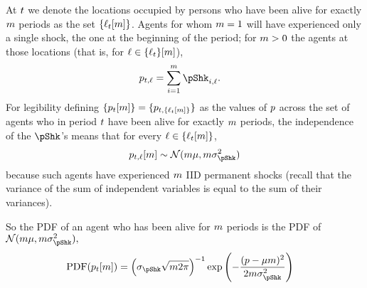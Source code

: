 \documentclass[../BufferStockTheory.tex]{subfiles}\usepackage{ApndxSteadyState}
\begin{document}
  At ${}t$ we denote the locations occupied by persons who have been alive for exactly $m$ periods as the set $\{\ell_{{}t}[m]\}$. Agents for whom $m=1$ will have experienced only a single shock, the one at the beginning of the period; for $m>0$ the agents at those locations (that is, for $\ell \in \{\ell_{{}t}\}[m]$),
  \begin{align}
    \pLog_{{\tp}\FutPer,\posn}  & = \sum_{\NewPer=1}^{\LooPer}\pShk_{{\tp}\NewPer,\posn}.
  \end{align}
  For legibility defining $\{p_{{}t}[m]\} = \{p_{{}t,\{\ell_{{}t}[m]\}}\}$ as the values of $p$ across the set of agents who in period ${}t$ have been alive for exactly $m$ periods, the independence of the $\pShk$'s means that for every $\ell \in \{\ell_{t}[m]\}$,
  \begin{align}
    \pLog_{\FutPer,\posn}[\LooPer] \sim \mathcal{N}(\LooPer \pShkMean,\LooPer \sigma^{2}_{\pShk}) \label{eq:dstpnm}
  \end{align}
  because such agents have experienced $m$ IID permanent shocks (recall that the variance of the sum of independent variables is equal to the sum of their variances).


  \newcommand{\PDF}{\textrm{PDF}}
  So the PDF of an agent who has been alive for $m$ periods is the PDF of $\mathcal{N}(\LooPer \pShkMean,\LooPer \sigma^{2}_{\pShk}),$
  \begin{align}
    \PDF(\pLog_{\FutPer}[\LooPer]) & = \left(
                                     {\sigma_{\pShk}\sqrt{\LooPer 2 \pi}}\right)^{-1} \exp\left(-\frac{(\pLog- \pShkMean \LooPer )^{2}}{2 \LooPer \sigma^{2}_{\pShk}}\right)
  \end{align}
\end{document}
